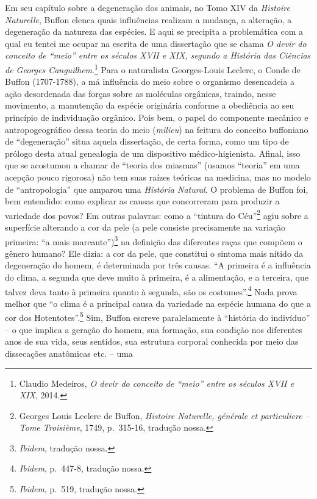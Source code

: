 Em seu capítulo sobre a degeneração dos animais, no Tomo XIV da
\emph{Histoire Naturelle}, Buffon elenca quais influências realizam a
mudança, a alteração, a degeneração da natureza das espécies. E aqui se
precipita a problemática com a qual eu tentei me ocupar na escrita de
uma dissertação que se chama \emph{O devir do conceito de ``meio'' entre
os séculos XVII e XIX, segundo a História das Ciências de Georges
Canguilhem}.\footnote{Claudio Medeiros, \emph{O devir do conceito de
  ``meio'' entre os séculos XVII e XIX}, 2014.} Para o naturalista
Georges-Louis Leclerc, o Conde de Buffon (1707-1788), a má influência do
meio sobre o organismo desencadeia a ação desordenada das forças sobre
as moléculas orgânicas, traindo, nesse movimento, a manutenção da
espécie originária conforme a obediência ao seu princípio de
individuação orgânico. Pois bem, o papel do componente mecânico e
antropogeográfico dessa teoria do meio (\emph{milieu}) na feitura do
conceito buffoniano de ``degeneração'' situa aquela dissertação, de
certa forma, como um tipo de prólogo desta atual genealogia de um
dispositivo médico-higienista. Afinal, isso que se acostumou a chamar de
``teoria dos miasmas'' (usamos ``teoria'' em uma acepção pouco rigorosa)
não tem suas raízes teóricas na medicina, mas no modelo de
``antropologia'' que amparou uma \emph{História Natural}. O problema de
Buffon foi, bem entendido: como explicar as causas que concorreram para
produzir a variedade dos povos? Em outras palavras: como a ``tintura do
Céu''\footnote{Georges Louis Leclerc de Buffon, \emph{Histoire
  Naturelle, générale et particuliere -- Tome Troisième}, 1749,
  p.~315-16, tradução nossa.} agiu sobre a superfície alterando a cor da
pele (a pele consiste precisamente na variação primeira: ``a mais
marcante'')\footnote{\emph{Ibidem}, tradução nossa.} na definição das
diferentes raças que compõem o gênero humano? Ele dizia: a cor da pele,
que constitui o sintoma mais nítido da degeneração do homem, é
determinada por três causas. ``A primeira é a influência do clima, a
segunda que deve muito à primeira, é a alimentação, e a terceira, que
talvez deva tanto à primeira quanto à segunda, são os
costumes''.\footnote{\emph{Ibidem}, p.~447-8, tradução nossa.} Nada
prova melhor que ``o clima é a principal causa da variedade na espécie
humana do que a cor dos Hotentotes''.\footnote{\emph{Ibidem}, p.~519,
  tradução nossa.} Sim, Buffon escreve paralelamente à ``história do
indivíduo'' -- o que implica a geração do homem, sua formação, sua
condição nos diferentes anos de sua vida, seus sentidos, sua estrutura
corporal conhecida por meio das dissecações anatômicas etc. -- uma
